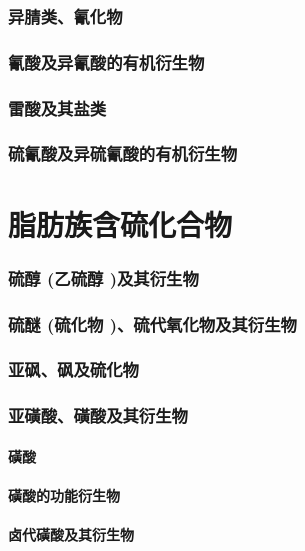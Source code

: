 \documentclass[UTF8]{../03-Chemistry}
\begin{document}
        \subsubsection{异腈类、氰化物}
        \subsubsection{氰酸及异氰酸的有机衍生物}
        \subsubsection{雷酸及其盐类}
        \subsubsection{硫氰酸及异硫氰酸的有机衍生物}


\section{脂肪族含硫化合物}
    \subsubsection{硫醇 (乙硫醇 )及其衍生物}
    \subsubsection{硫醚 (硫化物 )、硫代氧化物及其衍生物}
    \subsubsection{亚砜、砜及硫化物}
    \subsubsection{亚磺酸、磺酸及其衍生物}
        \paragraph{磺酸}
        \paragraph{磺酸的功能衍生物}
        \paragraph{卤代磺酸及其衍生物}
\end{document}
